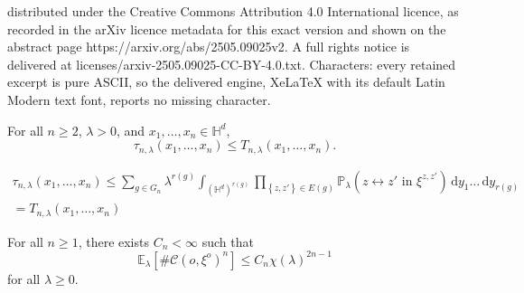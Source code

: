 \documentclass[10pt,a4paper]{amsart}
\newcommand{\C}{\mathscr {C}}
\newcommand{\HypDim}{{\mathbb{H}^d}}
\newcommand{\conn}[3]{#1 \longleftrightarrow #2\textrm { in } #3}
\newcommand{\dd}{\, \mathrm{d}}
\newcommand{\ela}{\mathbb E_{\lambda}}
\newcommand{\orig}{o}
\newcommand{\pla}{\mathbb P_\lambda}
\begin{document}
distributed under the Creative Commons Attribution 4.0 International licence, as recorded in the arXiv licence metadata for this exact version and shown on the abstract page https://arxiv.org/abs/2505.09025v2. A full rights notice is delivered at licenses/arxiv-2505.09025-CC-BY-4.0.txt. Characters: every retained excerpt is pure ASCII, so the delivered engine, XeLaTeX with its default Latin Modern text font, reports no missing character.
\begin{lemma}
\label{lem:nPointvsTree}
    For all $n\geq 2$, $\lambda>0$, and $x_1,\ldots,x_n\in\HypDim$,
    \begin{equation}
        \tau_{n,\lambda}\left(x_1,\ldots,x_n\right) \leq T_{n,\lambda}\left(x_1,\ldots,x_n\right).
    \end{equation}
\end{lemma}

\begin{multline}
    \tau_{n,\lambda}\left(x_1,\ldots,x_n\right)  \leq \sum_{g\in G_n}\lambda^{r(g)}\int_{\left(\HypDim\right)^{r(g)}} \prod_{\left\{z,z'\right\}\in E(g)}\pla\left(\conn{z}{z'}{\xi^{z,z'}}\right) \dd y_1\ldots \dd y_{r(g)}\\
     = T_{n,\lambda}\left(x_1,\ldots,x_n\right)\label{eqn:TreeGraphInequality}
\end{multline}

\begin{lemma}
\label{lem:nclusterUpper}
    For all $n\geq 1$, there exists $C_n <\infty$ such that
    \begin{equation}
        \ela\left[\#\C\left(\orig,\xi^{\orig}\right)^n\right] \leq C_n \chi\left(\lambda\right)^{2n-1}
    \end{equation}
    for all $\lambda\geq0$.
\end{lemma}
\end{document}
